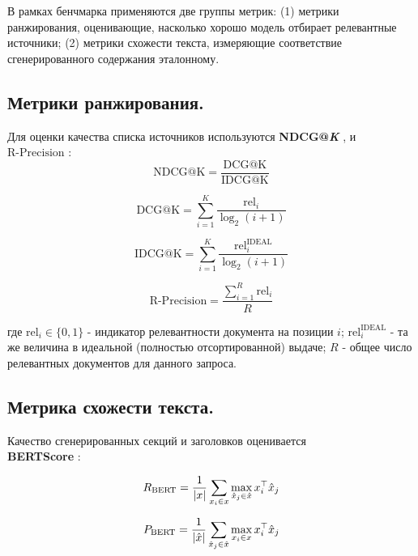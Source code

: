 \documentclass{article}
\begin{document}
В рамках бенчмарка применяются две группы метрик:  
(1) метрики ранжирования, оценивающие, насколько хорошо модель отбирает релевантные источники;  
(2) метрики схожести текста, измеряющие соответствие сгенерированного содержания эталонному.

\subsection*{Метрики ранжирования.}

Для оценки качества списка источников используются \textbf{NDCG@\textit{K}} \cite{ndcg}, и $\mathrm{R\text{-}Precision}$ \cite{rprecision}:
\begin{equation}\label{ndcg}
\mathrm{NDCG@K}= \frac{\mathrm{DCG@K}}{\mathrm{IDCG@K}}
\end{equation}

\begin{equation}\label{dcg}
\mathrm{DCG@K}= \sum_{i=1}^{K} \frac{\mathrm{rel}_i}{\log_2(i+1)}
\end{equation}

\begin{equation}\label{idcg}
\mathrm{IDCG@K}= \sum_{i=1}^{K} \frac{\mathrm{rel}^{\mathrm{IDEAL}}_i}{\log_2(i+1)}
\end{equation}

\begin{equation}\label{rpr}
\mathrm{R\text{-}Precision}= \frac{\sum_{i=1}^{R} \mathrm{rel}_i}{R}
\end{equation}

где \(\mathrm{rel}_i\in\{0,1\}\) - индикатор релевантности документа на позиции \(i\); \(\mathrm{rel}^{\mathrm{IDEAL}}_i\) - та же величина в идеальной (полностью отсортированной) выдаче;  
\(R\) - общее число релевантных документов для данного запроса.  

\subsection*{Метрика схожести текста.} 
Качество сгенерированных секций и заголовков оценивается \\\textbf{BERTScore} \cite{bertscore}:

\begin{equation}\label{precision}
R_{\mathrm{BERT}}= \frac{1}{|x|}\sum_{x_i\in x}\max_{\hat{x}_j\in\hat{x}} x_i^\top \hat{x}_j\\
\end{equation}

\begin{equation}\label{recall}
P_{\mathrm{BERT}}= \frac{1}{|\hat{x}|}\sum_{\hat{x}_j\in\hat{x}}\max_{x_i\in x} x_i^\top \hat{x}_j\\
\end{equation}
\end{document}
